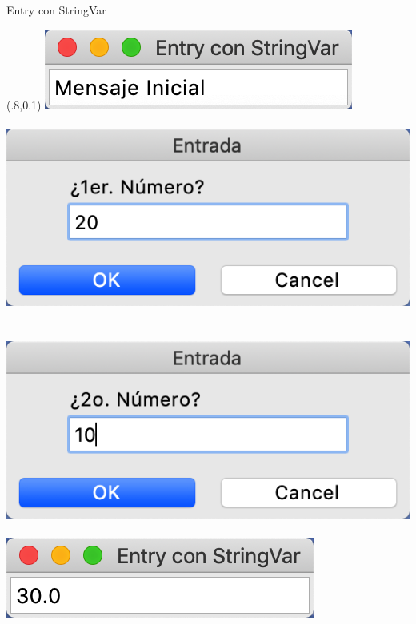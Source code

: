\documentclass[10pt, envcountsect , spanish]{beamer}
\begin{document}
\begin{frame}[fragile]{Entry con StringVar}
\begin{textblock*}{.30\textwidth}(.8\textwidth,0.1\textheight)
\includegraphics[width=\textwidth]{fig/entry-stringvar1}\\
\; \\
\includegraphics[width=\textwidth]{fig/entry-stringvar2}\\
\; \\
\; \\
\includegraphics[width=\textwidth]{fig/entry-stringvar3}\\
\; \\
\includegraphics[width=\textwidth]{fig/entry-stringvar4}
\end{textblock*}

\end{frame}
\end{document}
